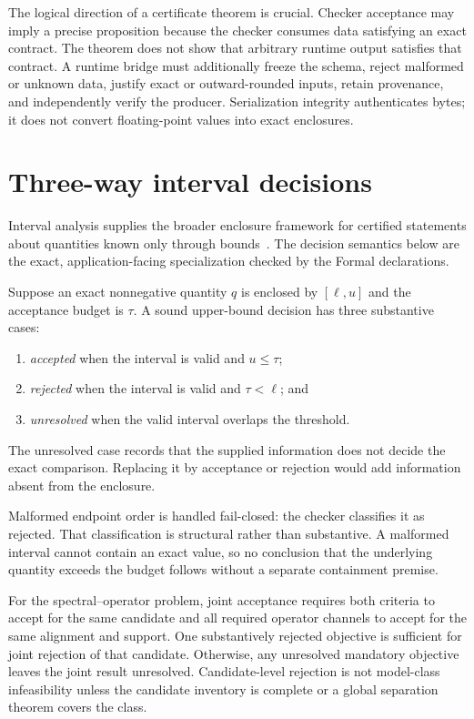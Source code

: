 The logical direction of a certificate theorem is crucial.  Checker acceptance may
imply a precise proposition because the checker consumes data satisfying an exact
contract.  The theorem does not show that arbitrary runtime output satisfies that
contract.  A runtime bridge must additionally freeze the schema, reject malformed or
unknown data, justify exact or outward-rounded inputs, retain provenance, and
independently verify the producer.  Serialization integrity authenticates bytes; it
does not convert floating-point values into exact enclosures.

\section{Three-way interval decisions}

Interval analysis supplies the broader enclosure framework for certified statements
about quantities known only through bounds~\cite{MooreKearfottCloud2009}. The decision
semantics below are the exact, application-facing specialization checked by the Formal
declarations.

Suppose an exact nonnegative quantity $q$ is enclosed by $[\ell,u]$ and the acceptance
budget is $\tau$.  A sound upper-bound decision has three substantive cases:

\begin{enumerate}
  \item \emph{accepted} when the interval is valid and $u\leq\tau$;
  \item \emph{rejected} when the interval is valid and $\tau<\ell$; and
  \item \emph{unresolved} when the valid interval overlaps the threshold.
\end{enumerate}

The unresolved case records that the supplied information does not decide the exact
comparison.  Replacing it by acceptance or rejection would add information absent from
the enclosure.

Malformed endpoint order is handled fail-closed: the checker classifies it as rejected.
That classification is structural rather than substantive.  A malformed interval
cannot contain an exact value, so no conclusion that the underlying quantity exceeds
the budget follows without a separate containment premise.

For the spectral--operator problem, joint acceptance requires both criteria to accept
for the same candidate and all required operator channels to accept for the same
alignment and support.  One substantively rejected objective is sufficient for joint
rejection of that candidate.  Otherwise, any unresolved mandatory objective leaves the
joint result unresolved.  Candidate-level rejection is not model-class infeasibility
unless the candidate inventory is complete or a global separation theorem covers the
class.

